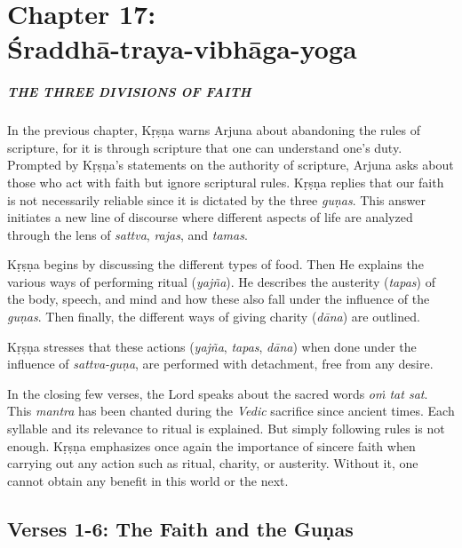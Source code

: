 \chapter{Chapter 17: \\Śraddhā-traya-vibhāga-yoga}\label{chap-sraddha-traya-vibhaga-yoga}

\paragraph*{\MakeUppercase{The Three Divisions of Faith}}

\noindent In the previous chapter, Kṛṣṇa warns Arjuna about abandoning the rules of scripture, for it is through scripture that one can understand one’s duty. Prompted by Kṛṣṇa's statements on the authority of scripture, Arjuna asks about those who act with faith but ignore scriptural rules. Kṛṣṇa replies that our faith is not necessarily reliable since it is dictated by the three \textit{guṇas}. This answer initiates a new line of discourse where different aspects of life are analyzed through the lens of \textit{sattva}, \textit{rajas}, and \textit{tamas}.

Kṛṣṇa begins by discussing the different types of food. Then He explains the various ways of performing ritual (\textit{yajña}). He describes the austerity (\textit{tapas}) of the body, speech, and mind and how these also fall under the influence of the \textit{guṇas}. Then finally, the different ways of giving charity (\textit{dāna}) are outlined.

Kṛṣṇa stresses that these actions (\textit{yajña}, \textit{tapas}, \textit{dāna}) when done under the influence of \textit{sattva-guṇa}, are performed with detachment, free from any desire.

In the closing few verses, the Lord speaks about the sacred words \textit{oṁ tat sat}. This \textit{mantra} has been chanted during the \textit{Vedic} sacrifice since ancient times. Each syllable and its relevance to ritual is explained. But simply following rules is not enough. Kṛṣṇa emphasizes once again the importance of sincere faith when carrying out any action such as ritual, charity, or austerity. Without it, one cannot obtain any benefit in this world or the next.

\section{Verses 1-6: The Faith and the Guṇas}\label{sec-verses-1-6-the-faith-and-the-gunas}

